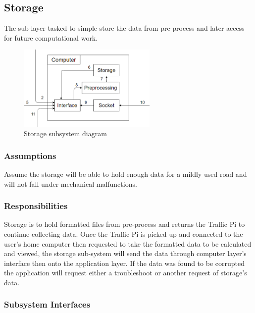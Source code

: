 \subsection{Storage}
The sub-layer tasked to simple store the data from pre-process and later access for future computational work.

\begin{figure}[h!]
	\centering
 	\includegraphics[width=0.60\textwidth]{images/computer_subsystem.png}
 \caption{Storage subsystem diagram}
\end{figure}

\subsubsection{Assumptions}
Assume the storage will be able to hold enough data for a mildly used road and will not fall under mechanical malfunctions.

\subsubsection{Responsibilities}
Storage is to hold formatted files from pre-process and returns the Traffic Pi to continue collecting data. Once the Traffic Pi is picked up and connected to the user's home computer then requested to take the formatted data to be calculated and viewed, the storage sub-system will send the data through computer layer's interface then onto the application layer. If the data was found to be corrupted the  application will request either a troubleshoot or another request of storage's data.

\subsubsection{Subsystem Interfaces}

